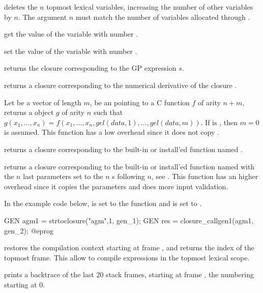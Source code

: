  deletes the $n$ topmost lexical variables,
increasing the number of other variables by $n$. The argument $n$ must match
the number of variables allocated through .

 get the value of the variable with number .

 set the value of the variable with number
.


 returns the closure corresponding to the
GP expression $s$.

 returns a closure corresponding to the
numerical derivative of the closure .

Let  be a vector of length $m$,  be an 
pointing to a C function $f$ of arity $n+m$, returns a  object
$g$ of arity $n$ such that
$g(x_1,\ldots,x_n)=f(x_1,\ldots,x_n,gel(data,1),...,gel(data,m))$. If
 is , then $m=0$ is assumed.  This function has a low
overhead since it does not copy .

 returns a closure corresponding to the
built-in or install'ed function named .

 returns a closure
corresponding to the built-in or install'ed function named  with the
$n$ last parameters set to the $n$ s following $n$, see
. This function has an higher overhead since it copies the
parameters and does more input validation.

In the example code below,  is set to the function
 and  is set to .

\bprog
  GEN agm1 = strtoclosure("agm",1, gen_1);
  GEN res = closure_callgen1(agm1, gen_2);
@eprog

 restores the compilation context starting
at frame , and returns the index of the topmost frame. This allow to
compile expressions in the topmost lexical scope.

 prints a backtrace of the last $20$ stack
frames, starting at frame , the numbering starting at $0$.

